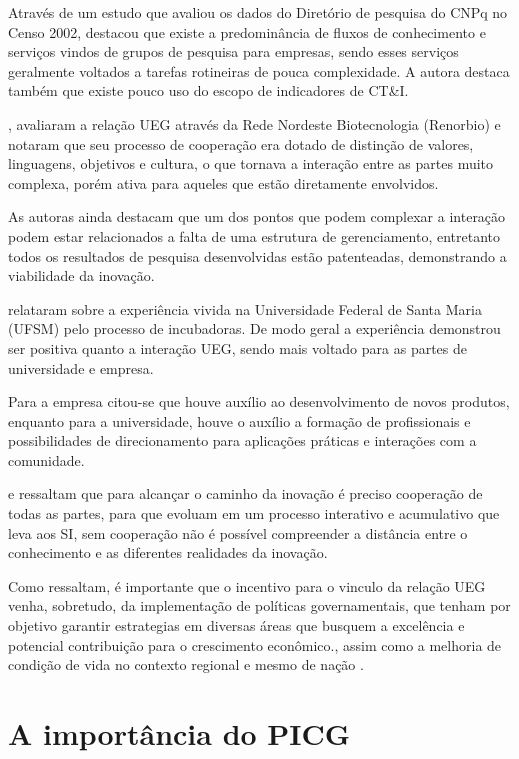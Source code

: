 Através de um estudo que avaliou os dados do Diretório de pesquisa do CNPq no Censo 2002,  destacou que existe a predominância de fluxos de conhecimento e serviços vindos de grupos de pesquisa para empresas, sendo esses serviços geralmente voltados a tarefas rotineiras de pouca complexidade. A autora destaca também que existe pouco uso do escopo de indicadores de CT\&I.

, avaliaram a relação UEG através da Rede Nordeste Biotecnologia (Renorbio) e notaram que seu processo de cooperação era dotado de distinção de valores, linguagens, objetivos e cultura, o que tornava a interação entre as partes muito complexa, porém ativa para aqueles que estão diretamente envolvidos.

As autoras ainda destacam que um dos pontos que podem complexar a interação podem estar relacionados a falta de uma estrutura de gerenciamento, entretanto todos os resultados de pesquisa desenvolvidas estão patenteadas, demonstrando a viabilidade da inovação.

 relataram sobre a experiência vivida na Universidade Federal de Santa Maria (UFSM) pelo processo de incubadoras. De modo geral a experiência demonstrou ser positiva quanto a interação UEG, sendo mais voltado para as partes de universidade e empresa.

Para a empresa citou-se que houve auxílio ao desenvolvimento de novos produtos, enquanto para a universidade, houve o auxílio a formação de profissionais e possibilidades de direcionamento para aplicações práticas e interações com a comunidade.

 e  ressaltam que para alcançar o caminho da inovação é preciso cooperação de todas as partes, para que evoluam em um processo interativo e acumulativo que leva aos SI, sem cooperação não é possível compreender a distância entre o conhecimento e as diferentes  realidades da inovação.

Como  ressaltam, é importante que o incentivo para o vinculo da relação UEG venha, sobretudo, da implementação de políticas governamentais, que tenham por objetivo garantir estrategias em diversas áreas que busquem a excelência e potencial contribuição para o crescimento econômico., assim como a melhoria de condição de vida no contexto regional e mesmo de nação \cite{lastres2005conhecimento}.

\section{A importância do PICG}

